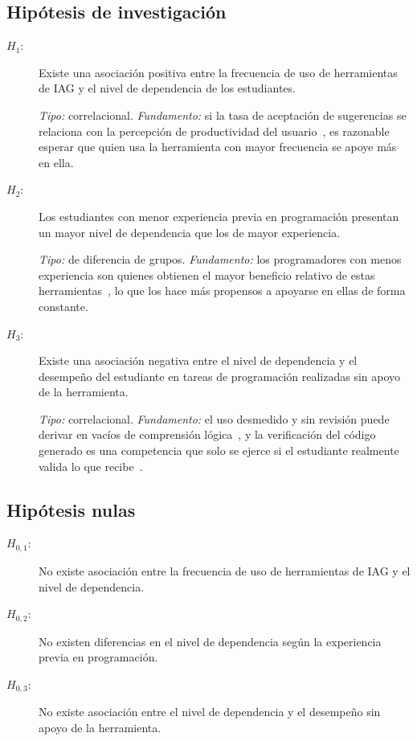 \documentclass[12pt,letterpaper]{article}
\begin{document}
\subsection{Hipótesis de investigación}

\begin{description}
  \item[$H_1$:] Existe una asociación positiva entre la frecuencia de uso de herramientas de IAG y el nivel de dependencia de los estudiantes.

  \emph{Tipo:} correlacional. \emph{Fundamento:} si la tasa de aceptación de sugerencias se relaciona con la percepción de productividad del usuario~\cite{ziegler2022measuring}, es razonable esperar que quien usa la herramienta con mayor frecuencia se apoye más en ella.

  \item[$H_2$:] Los estudiantes con menor experiencia previa en programación presentan un mayor nivel de dependencia que los de mayor experiencia.

  \emph{Tipo:} de diferencia de grupos. \emph{Fundamento:} los programadores con menos experiencia son quienes obtienen el mayor beneficio relativo de estas herramientas~\cite{peng2023impact}, lo que los hace más propensos a apoyarse en ellas de forma constante.

  \item[$H_3$:] Existe una asociación negativa entre el nivel de dependencia y el desempeño del estudiante en tareas de programación realizadas sin apoyo de la herramienta.

  \emph{Tipo:} correlacional. \emph{Fundamento:} el uso desmedido y sin revisión puede derivar en vacíos de comprensión lógica~\cite{martinovic2024ai}, y la verificación del código generado es una competencia que solo se ejerce si el estudiante realmente valida lo que recibe~\cite{prather2023programming,ieee2024assisted}.
\end{description}

\subsection{Hipótesis nulas}

\begin{description}
  \item[$H_{0,1}$:] No existe asociación entre la frecuencia de uso de herramientas de IAG y el nivel de dependencia.
  \item[$H_{0,2}$:] No existen diferencias en el nivel de dependencia según la experiencia previa en programación.
  \item[$H_{0,3}$:] No existe asociación entre el nivel de dependencia y el desempeño sin apoyo de la herramienta.
\end{description}
\end{document}
